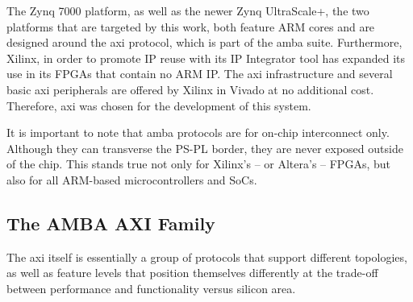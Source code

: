 The Zynq 7000 platform, as well as the newer Zynq UltraScale+, 
the two platforms that are targeted by this work,
both feature ARM cores and are designed around the \gls{axi} protocol,
which is part of the \gls{amba} suite. 
Furthermore, Xilinx, in order to promote IP reuse with its IP Integrator tool
has expanded its use in its FPGAs that contain no ARM IP. 
The \gls{axi} infrastructure and several basic \gls{axi} peripherals
are offered by Xilinx in Vivado at no additional cost.
Therefore, \gls{axi} was chosen for the development of this system.

It is important to note that \gls{amba} protocols are for on-chip interconnect only.
Although they can transverse the PS-PL border,
they are never exposed outside of the chip. 
This stands true not only for Xilinx's -- or Altera's -- FPGAs, 
but also for all ARM-based microcontrollers and SoCs.

\subsection{The AMBA AXI Family}

\label{amba}
The \gls{axi} itself is essentially a group of protocols that support different topologies,
as well as feature levels that position themselves differently at the trade-off 
between performance and functionality versus silicon area.

